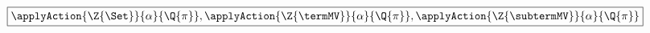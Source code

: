 


\noindent $\boxed{\applyAction{ \Z{\Set} }{ \alpha }{ \Q{\pi} }, \applyAction{ \Z{\termMV} }{ \alpha }{ \Q{\pi} } , \applyAction{ \Z{\subtermMV} }{ \alpha }{ \Q{\pi} }}$
%
